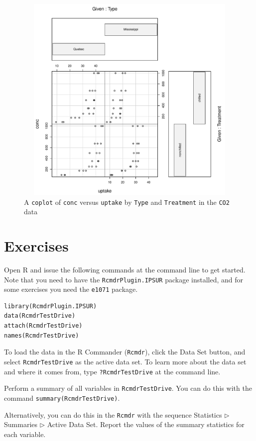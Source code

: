 \documentclass[captions=tableheading]{scrbook}
\begin{document}
\begin{figure}[th]
    \includegraphics[width=5in, height=4in]{img/coplot.pdf}
    \caption[A \texttt{coplot} of \texttt{conc} versus \texttt{uptake} by \texttt{Type} and \texttt{Treatment}]{A \texttt{coplot} of \texttt{conc} versus \texttt{uptake} by \texttt{Type} and \texttt{Treatment} in the \texttt{CO2} data}
    \label{fig:coplot}
  \end{figure}

\newpage{}
\section{Exercises}
\label{sec-3-7}

\setcounter{thm}{0}

Open \textsf{R} and issue the following commands at the command line to get started. Note that you need to have the \texttt{RcmdrPlugin.IPSUR} package installed, and for some exercises you need the \texttt{e1071} package.


\begin{verbatim}
library(RcmdrPlugin.IPSUR)
data(RcmdrTestDrive)
attach(RcmdrTestDrive)
names(RcmdrTestDrive)
\end{verbatim}

To load the data in the \textsf{R} Commander (\texttt{Rcmdr}), click the \textsf{Data Set} button, and select \texttt{RcmdrTestDrive} as the active data set. To learn more about the data set and where it comes from, type \texttt{?RcmdrTestDrive} at the command line.

\begin{xca}
\label{xca:summary-RcmdrTestDrive}

Perform a summary of all variables in \texttt{RcmdrTestDrive}. You can do this with the command \texttt{summary(RcmdrTestDrive)}.

Alternatively, you can do this in the \texttt{Rcmdr} with the sequence \textsf{Statistics} \textsf{\(\triangleright\) Summaries} \textsf{\(\triangleright\) Active Data Set}. Report the values of the summary statistics for each variable.

\end{xca}
\end{document}
